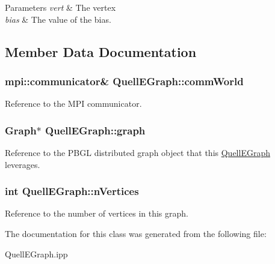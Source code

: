 \begin{DoxyParams}{Parameters}
{\em vert} & The vertex \\
\hline
{\em bias} & The value of the bias. \\
\hline
\end{DoxyParams}


\subsection{Member Data Documentation}
\subsubsection[{\texorpdfstring{comm\+World}{commWorld}}]{\setlength{\rightskip}{0pt plus 5cm}mpi\+::communicator\& Quell\+E\+Graph\+::comm\+World\hspace{0.3cm}{\ttfamily [protected]}}\hypertarget{a00100_abaf47f32f5722caa50a241188802bfd9}{}\label{a00100_abaf47f32f5722caa50a241188802bfd9}
Reference to the M\+PI communicator. 
\subsubsection[{\texorpdfstring{graph}{graph}}]{\setlength{\rightskip}{0pt plus 5cm}Graph$\ast$ Quell\+E\+Graph\+::graph\hspace{0.3cm}{\ttfamily [protected]}}\hypertarget{a00100_a6d06d2e18af59d496531f9cf3b1d62a4}{}\label{a00100_a6d06d2e18af59d496531f9cf3b1d62a4}
Reference to the P\+B\+GL distributed graph object that this \hyperlink{a00100}{Quell\+E\+Graph} leverages. 
\subsubsection[{\texorpdfstring{n\+Vertices}{nVertices}}]{\setlength{\rightskip}{0pt plus 5cm}int Quell\+E\+Graph\+::n\+Vertices\hspace{0.3cm}{\ttfamily [protected]}}\hypertarget{a00100_aedbe28d892ab9e08522395cd1b63c612}{}\label{a00100_aedbe28d892ab9e08522395cd1b63c612}
Reference to the number of vertices in this graph. 

The documentation for this class was generated from the following file\+:\begin{DoxyCompactItemize}
\item 
Quell\+E\+Graph.\+ipp\end{DoxyCompactItemize}
